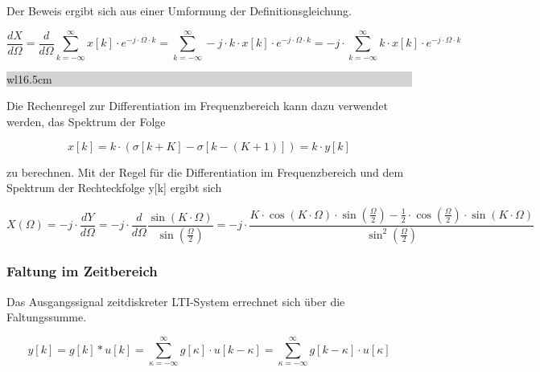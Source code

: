 \noindent Der Beweis ergibt sich aus einer Umformung der Definitionsgleichung.

\begin{equation}\label{eq:sevenseventy}
\frac{dX}{d\Omega } =\frac{d}{d\Omega } \sum _{k=-\infty }^{\infty }x\left[k\right]\cdot e^{-j\cdot \Omega \cdot k}  =\sum _{k=-\infty }^{\infty }-j\cdot k\cdot x\left[k\right]\cdot e^{-j\cdot \Omega \cdot k}  =-j\cdot \sum _{k=-\infty }^{\infty }k\cdot x\left[k\right]\cdot e^{-j\cdot \Omega \cdot k}
\end{equation}

\noindent
\colorbox{lightgray}{%
%
\renewcommand\arraystretch{0.6}%
\begin{tabular}{ wl{16.5cm} }
{\selectfont{Beispiel: Differentiation im Frequenzbereich}}
\end{tabular}%
}\medskip

\noindent Die Rechenregel zur Differentiation im Frequenzbereich kann dazu verwendet werden, das Spektrum der Folge

\begin{equation}\label{eq:sevenseventyone}
x\left[k\right]=k\cdot \left(\sigma \left[k+K\right]-\sigma \left[k-\left(K+1\right)\right]\right)=k\cdot y\left[k\right]
\end{equation}

\noindent zu berechnen. Mit der Regel f\"{u}r die Differentiation im Frequenzbereich und dem Spektrum der Rechteckfolge y[k] ergibt sich

\begin{equation}\label{eq:sevenseventytwo}
X\left(\Omega \right)=-j\cdot \frac{dY}{d\Omega } =-j\cdot \frac{d}{d\Omega } \frac{\sin \left(K\cdot \Omega \right)}{\sin \left(\frac{\Omega }{2} \right)} =-j\cdot \frac{K\cdot \cos \left(K\cdot \Omega \right)\cdot \sin \left(\frac{\Omega }{2} \right)-\frac{1}{2} \cdot \cos \left(\frac{\Omega }{2} \right)\cdot \sin \left(K\cdot \Omega \right)}{\sin ^{2} \left(\frac{\Omega }{2} \right)}
\end{equation}

\subsubsection{Faltung im Zeitbereich}

\noindent Das Ausgangssignal zeitdiskreter LTI-System errechnet sich \"{u}ber die Faltungssumme.

\begin{equation}\label{eq:sevenseventythree}
y\left[k\right]=g\left[k\right]*u\left[k\right]=\sum _{\kappa =-\infty }^{\infty }g\left[\kappa \right]\cdot u\left[k-\kappa \right] =\sum _{\kappa =-\infty }^{\infty }g\left[k-\kappa \right] \cdot u\left[\kappa \right]
\end{equation}

